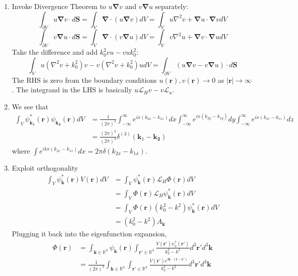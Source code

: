 \documentclass[a4paper]{article}
\begin{document}
\begin{ans}\leavevmode
\begin{enumerate}[label=(\roman*)]
\item Invoke Divergence Theorem to $u\boldsymbol{\nabla}v$ and $v\boldsymbol{\nabla}u$ separately:
$$\int_{\partial V}u\boldsymbol{\nabla}v\cdot d\mathbf{S}=\int_V\boldsymbol{\nabla}\cdot(u\boldsymbol{\nabla}v)dV=\int_Vu\nabla^2v+\boldsymbol{\nabla}u\cdot\boldsymbol{\nabla}vdV$$
$$\int_{\partial V}v\boldsymbol{\nabla}u\cdot d\mathbf{S}=\int_V\boldsymbol{\nabla}\cdot(v\boldsymbol{\nabla}u)dV=\int_Vv\nabla^2u+\boldsymbol{\nabla}v\cdot\boldsymbol{\nabla}udV$$
Take the difference and add $k_0^2vu-vuk_0^2$:
$$\int_Vu(\nabla^2v+k_0^2)v-v(\nabla^2v+k_0^2)udV=\int_{\partial V}(u\boldsymbol{\nabla}v-v\boldsymbol{\nabla}u)\cdot d\mathbf{S}$$
The RHS is zero from the boundary conditions $u(\mathbf{r}),v(\mathbf{r})\rightarrow 0$ as $|\mathbf{r}|\rightarrow\infty$. The integrand in the LHS is basically $u\mathcal{L}_Hv-v\mathcal{L}_u$.
\item We see that
\begin{align}
\int_V\psi_{\mathbf{k_1}}^*(\mathbf{r})\psi_{\mathbf{k_2}}(\mathbf{r})dV&=\frac{1}{(2\pi)^3}\int_{-\infty}^\infty e^{ix(k_{2x}-k_{1x})}dx\int_{-\infty}^\infty e^{ix(k_{2y}-k_{1y})}dy\int_{-\infty}^\infty e^{ix(k_{2z}-k_{1z})}dz\nonumber\\&=\frac{(2\pi)^3}{(2\pi)^3}\delta^{(3)}(\mathbf{k}_1-\mathbf{k_2})\nonumber
\end{align}
where $\int e^{ikx(k_{2x}-k_{1x})}dx=2\pi\delta(k_{2x}-k_{1x})$.
\item Exploit orthogonality
\begin{align}
\int_V\psi^*_{\mathbf{k}}(\mathbf{r})V(\mathbf{r})dV&=\int_V\psi_{\mathbf{k}}^*(\mathbf{r})\mathcal{L}_H\Phi(\mathbf{r})dV\nonumber\\&=\int_V\Phi(\mathbf{r})\mathcal{L}_H\psi_{\mathbf{k}}^*(\mathbf{r})dV\nonumber\\&=\int_V\Phi(\mathbf{r})(k_0^2-k^2)\psi_{\mathbf{k}}^*(\mathbf{r})dV\nonumber\\&=(k_0^2-k^2)A_{\mathbf{k}}\nonumber
\end{align}
Plugging it back into the eigenfunction expansion,
\begin{align}
\Phi(\mathbf{r})&=\int_{\mathbf{k}\in\mathbb{R}^3}\psi_{\mathbf{k}}(\mathbf{r})\int_{\mathbf{r'}\in\mathbb{R}^3}\frac{V(\mathbf{r'})\psi_k^*(\mathbf{r'})}{k_0^2-k^2}d^3\mathbf{r'}d^3\mathbf{k}\nonumber\\&=\frac{1}{(2\pi)^3}\int_{\mathbf{k}\in\mathbb{R}^3}\int_{\mathbf{r'}\in\mathbb{R}^3}\frac{V(\mathbf{r'})e^{i\mathbf{k}\cdot(\mathbf{r}-\mathbf{r'})}}{k_0^2-k^2}d^3\mathbf{r'}d^3\mathbf{k}\nonumber

\end{align}
\end{enumerate}
\end{ans}
\end{document}
